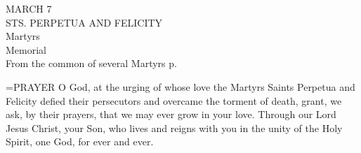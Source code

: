 \begin{center}\normalsize MARCH 7\\
\footnotesize STS. PERPETUA AND FELICITY\\
\footnotesize Martyrs\\
\footnotesize Memorial\\
\footnotesize From the common of several Martyrs p. \\
\end{center}

\hangindent=\parindent \small{PRAYER 
O God, at the urging of whose love
the Martyrs Saints Perpetua and Felicity
defied their persecutors and overcame the torment of death,
grant, we ask, by their prayers, that we may ever grow in your love.
Through our Lord Jesus Christ, your Son,
who lives and reigns with you in the unity of the Holy Spirit,
one God, for ever and ever.\\}
 
